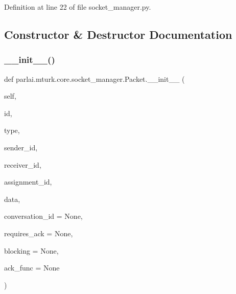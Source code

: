 Definition at line 22 of file socket\+\_\+manager.\+py.



\subsection{Constructor \& Destructor Documentation}
\mbox{\label{classparlai_1_1mturk_1_1core_1_1socket__manager_1_1Packet_a25f1f794ffd01fb70e9b6b8acd0a33be}} 
\subsubsection{\texorpdfstring{\+\_\+\+\_\+init\+\_\+\+\_\+()}{\_\_init\_\_()}}
{\footnotesize\ttfamily def parlai.\+mturk.\+core.\+socket\+\_\+manager.\+Packet.\+\_\+\+\_\+init\+\_\+\+\_\+ (\begin{DoxyParamCaption}\item[{}]{self,  }\item[{}]{id,  }\item[{}]{type,  }\item[{}]{sender\+\_\+id,  }\item[{}]{receiver\+\_\+id,  }\item[{}]{assignment\+\_\+id,  }\item[{}]{data,  }\item[{}]{conversation\+\_\+id = {\ttfamily None},  }\item[{}]{requires\+\_\+ack = {\ttfamily None},  }\item[{}]{blocking = {\ttfamily None},  }\item[{}]{ack\+\_\+func = {\ttfamily None} }\end{DoxyParamCaption})}

